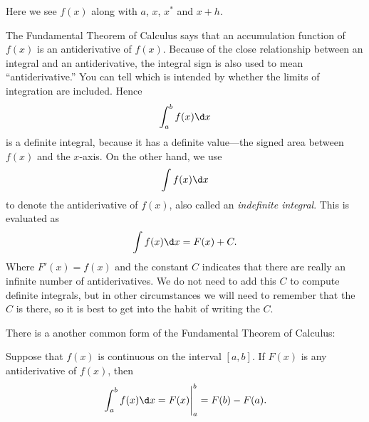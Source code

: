 \begin{marginfigure}[-6in]
\caption{Here we see $f(x)$ along with $a$, $x$, $x^*$ and $x+h$.}
\label{F:fun diagram}
\end{marginfigure}


The Fundamental Theorem of Calculus says that an accumulation function
of $f(x)$ is an antiderivative of $f(x)$.  Because of the close
relationship between an integral and an antiderivative, the integral
sign is also used to mean ``antiderivative.'' You can tell which is
intended by whether the limits of integration are included. Hence
\[
  \int_a^b f(x)\d x
\] 
is a definite integral, because it has a definite value---the signed
area between $f(x)$ and the $x$-axis.  On the other hand, we use
\[
  \int f(x)\d x
\]
to denote the antiderivative of $f(x)$, also called an
\textit{indefinite integral}.
This is evaluated as
\[
  \int f(x)\d x = F(x)+C.
\]
Where $F'(x) = f(x)$ and the constant $C$ indicates that there are
really an infinite number of antiderivatives. We do not need to add
this $C$ to compute definite integrals, but in other circumstances we
will need to remember that the $C$ is there, so it is best to get into
the habit of writing the $C$.

There is a another common form of the Fundamental Theorem of Calculus:

\begin{mainTheorem}
\label{thm:fundamental_theorem_II}\hfil

\noindent Suppose that $f(x)$ is continuous on the interval $[a,b]$. If $F(x)$
is any antiderivative of $f(x)$, then
\[
  \left.\int_a^b f(x)\d x = F(x) \right|_a^b = F(b)-F(a).
\]
\end{mainTheorem}

